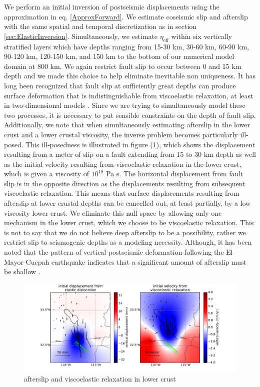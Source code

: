 \documentclass[1p]{elsarticle}
\begin{document}
We perform an initial inversion of postseismic displacements using the approximation in eq. \ref{ApproxForward}.  We estimate coseismic slip and afterslip with the same spatial and temporal discretization as in section \ref{sec:ElasticInversion}. Simultaneously, we estimate $\eta_{\mathrm{eff}}$ within six vertically stratified layers which have depths ranging from 15-30 km, 30-60 km, 60-90 km, 90-120 km, 120-150 km, and 150 km to the bottom of our numerical model domain at 800 km.  We again restrict fault slip to occur between 0 and 15 km depth and we made this choice to help eliminate inevitable non uniqueness.  It has long been recognized that fault slip at sufficiently great depths can produce surface deformation that is indistinguishable from viscoelastic relaxation, at least in two-dimensional models \citep{Savage1990}. Since we are trying to simultaneously model these two processes, it is necessary to put sensible constraints on the depth of fault slip.  Additionally, we note that when simultaneously estimating afterslip in the lower crust and a lower crustal viscosity, the inverse problem becomes particularly ill-posed. This ill-posedness is illustrated in figure (\ref{fig:LowerCrust}), which shows the displacement resulting from a meter of slip on a fault extending from 15 to 30 km depth as well as the initial velocity resulting from viscoelastic relaxation in the lower crust, which is given a viscosity of $10^{18}$ Pa s.  The horizontal displacement from fault slip is in the opposite direction as the displacements resulting from subsequent viscoelastic relaxation.  This means that surface displacements resulting from afterslip at lower crustal depths can be cancelled out, at least partially, by a low viscosity lower crust.  We eliminate this null space by allowing only one mechanism in the lower crust, which we choose to be viscoelastic relaxation.  This is not to say that we do not believe deep afterslip to be a possibility, rather we restrict slip to seismogenic depths as a modeling necessity. Although, it has been noted that the pattern of vertical postseismic deformation following the El Mayor-Cucpah earthquake indicates that a significant amount of afterslip must be shallow \cite{Rollins2015}.  
 
\begin{figure}
\includegraphics[scale=0.5]{Figures/Cancellation}
\caption{afterslip and viscoelastic relaxation in lower crust}
\label{fig:LowerCrust}
\end{figure}
 
\end{document}
